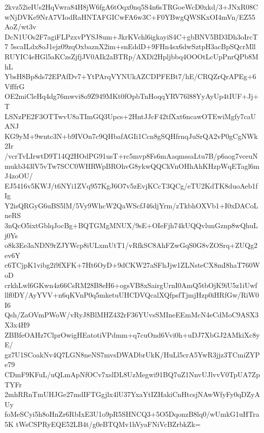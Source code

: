 2kvz52ieIUs2HqVwra84H8jW6fgA6tOqx0nq5S4n6sTRGoeWcD0xkd/3+JNxR08C
wNjDVKe9NrA7VIodRaHNTAFGICwFA6w3C+F0YBwgQWSKxOI4mVn/EZ55AoZ/wt3v
DcN1UOs2F7agiFLPzxvPYSJ8um+JkrKVchl6igkayiS4C+gbBNV5BD3Dh3oIrcT7
5scaILdx8oJ1ejz09zqOxbaznX2im+snEddD+9FHn4sx6dwSztpH3acBpSQcrMll
RUYIC4eHGl5aKCzsZjfjJV0AIk2aBTRp/AXDi2Hpljbbq4OOOtLcUpPnrQPb8MhL
YbsH8Bp8ds72EPAfDv7+YtPArqVYNUkAZCDPFEBt7/hE/CRQZrQrAPEg+6VfffrG
OE2miCleHq4dg76mwvi8o9Z949MKt0fOpbTnHoqqYRV76l88YyAyUp4tIUF+Jj+T
LSNzPE2F3OTTwvU8aTImGQ3Upcs+2HntJJcF42tfXxt6ncawOTEwiMgfy7caUANJ
KG9yM+9wntc3N+b9IVOn7c9QHbafAGIi1Ccn8gSQHfrnqJuSrQA2vP0gCgNWk2Ir
/vcrTvLIrwtD9T14Q2HOdPG91usT+rc5mvp8Fs6mAaqmssaLtu7B/p6aog7vceuN
mukb343lV5vTw7SCC0WHRWpBROhvG8ykwQQCkVnOHhAhKHzpWqETagl6mJ4zoOU/
EJ5416v5KWJ/t6NYi1ZVq957KgJ6O7v5zEvjKCcT3QCg/eTU2KdTK8duoAeb1fIg
Y2isQRGyG6uBS5lM/5Vy9WhcW2QaWScfJ46djYrm/zTkbhOXVb1+I0xDACoLneRS
3nQcO5ixtGblqJocBg+BQTGMgMNUX/9sE+OIeFjh74kUQQvlunGznp8wQhuLj0Ys
o8k3Ee3aNDN9rZJYWcp8iULxmUtT1/vRfkSC8AhFZwGqS0G8vZOSrq+ZUQg2ev6Y
c6TCjpK1vibg2i9fXFK+7Ht6OyD+9dCKW27aSFhJjw1ZLNsteCX8mI8haT760WoD
crkhLwl6GKwn4z66CsRM28B8eH6+ogsVB8xSairgUrnI0AmQ5tbOjK9iU5z1iUwf
llf0DY/AyYVV+n6qKVnP0q5mketuUHCDVQcalXQfpsfTjmjHzp0iHRfGw/RiW0I6
Qsh/ZaOVmPWoW/vRyJ8BlMHZ432rF36YUvsSMIneEEmMcN4eCdMoC9ASX3X3x4H9
ZBBfeOAHz7ClprOwigHEatotiVPdmm+q7cuOnd6Vvi0h+uDJ7XbGJ2AMkiXc8yE/
gz7U1SCoakNv4Q7LGN8neNS7mvsDWADbrUkK/HuLl5crA5YwR3jjz3TCmiZYPe79
CDmF9KFuL/uQLmApNfOCv7xslDL8UzMegwi91BQ7uZ1NnvUJlvvV0TpUA7ZpTYFr
2mhRRnTmUHJGe27mdIFTGgjlx4lU37YxaYtIZHakiCnHtcsjNAwWfyFy0qDZyAUy
foMeSCyi5h8oHnZr6RbIxE3U1o9pR5SHNCQ3+5O5DqonzB8lq0/wUmkG1uHTra5K
tWsCSPRyEQE52LB4t/g0eBTQMv1hVyaFNiVcBZrbkZk=
